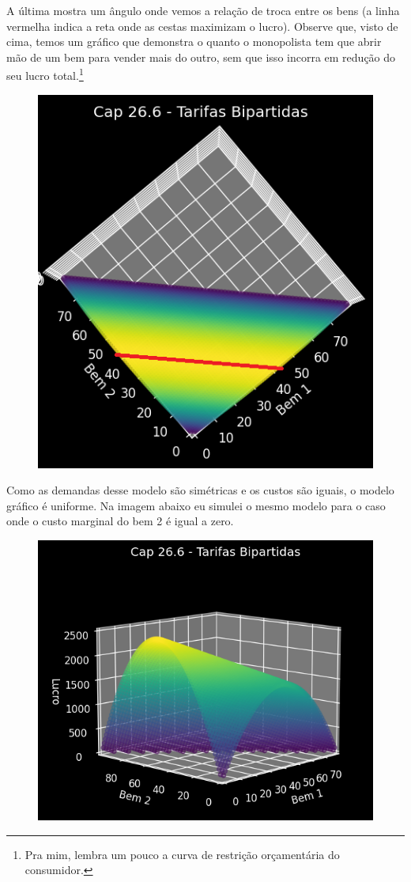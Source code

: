 \documentclass[a4paper,11pt,oneside]{book}
\theoremstyle{definition}
\theoremstyle{break}
\begin{document}
A última mostra um ângulo onde vemos a relação de troca entre os bens (a linha vermelha indica a reta onde as cestas maximizam o lucro). Observe que, visto de cima, temos um gráfico que demonstra o quanto o monopolista tem que abrir mão de um bem para vender mais do outro, sem que isso incorra em redução do seu lucro total.\footnote{Pra mim, lembra um pouco a curva de restrição orçamentária do consumidor.}

\begin{figure}[H]
\centering
\includegraphics[scale=0.60]{cap26_6-tarifas_bipartidas4.png}
\end{figure}

Como as demandas desse modelo são simétricas e os custos são iguais, o modelo gráfico é uniforme. Na imagem abaixo eu simulei o mesmo modelo para o caso onde o custo marginal do bem 2 é igual a zero.

\begin{figure}[H]
\centering
\includegraphics[scale=0.75]{cap26_6-tarifas_bipartidas5.png}
\end{figure}
\end{document}
